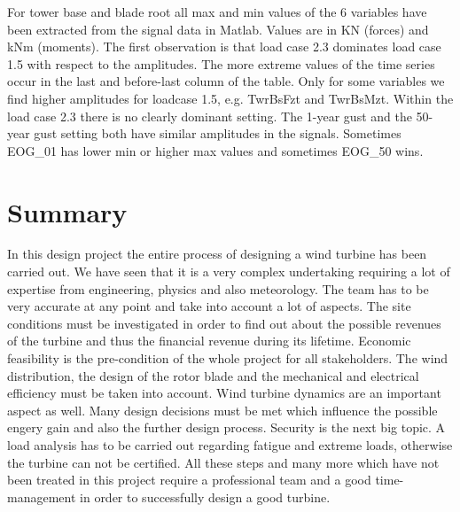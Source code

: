 \documentclass[10pt]{article}
\begin{document}
For tower base and blade root all max and min values of the 6 variables have been extracted from the signal data in Matlab. Values are in KN (forces) and kNm (moments). The first observation is that load case 2.3 dominates load case 1.5 with respect to the amplitudes. The more extreme values of the time series occur in the last and before-last column of the table. Only for some variables we find higher amplitudes for loadcase 1.5, e.g. TwrBsFzt and TwrBsMzt. 
Within the load case 2.3 there is no clearly dominant setting. The 1-year gust and the 50-year gust setting both have similar amplitudes in the signals. Sometimes EOG\_01 has lower min or higher max values and sometimes EOG\_50 wins.

\section{Summary}
In this design project the entire process of designing a wind turbine has been carried out. We have seen that it is a very complex undertaking requiring a lot of expertise from engineering, physics and also meteorology. The team has to be very accurate at any point and take into account a lot of aspects. The site conditions must be investigated in order to find out about the possible revenues of the turbine and thus the financial revenue during its lifetime. Economic feasibility is the pre-condition of the whole project for all stakeholders.
The wind distribution, the design of the rotor blade and the mechanical
and electrical efficiency must be taken into account. Wind turbine dynamics are an important aspect as well. Many design decisions must be met which influence the possible engery gain and also the further design process. Security is the next big topic. A load analysis has to be carried out regarding fatigue and extreme loads, otherwise the turbine can not be certified.
All these steps and many more which have not been treated in this project require a professional team and a good time-management in order to successfully design a good turbine.
\end{document}
